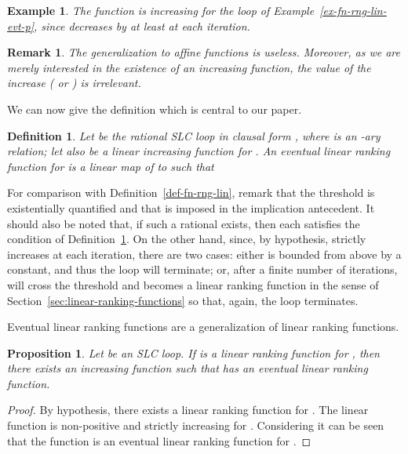 \documentclass{acm_proc_article-sp}
\newtheorem{proposition}[theorem]{Proposition}
\newtheorem{definition}[theorem]{Definition}
\newtheorem{example}[theorem]{Example}
\newtheorem{remark}[theorem]{Remark}
\begin{document}
\begin{example}
\label{ex-fn-rng-lin-evt-f}
The function  is increasing for the loop of
\textup{Example~\ref{ex-fn-rng-lin-evt-p}}, since  decreases by at
least  at each iteration.
\end{example}

\begin{remark}
The generalization to affine functions  is useless.
Moreover, as we are merely interested in the existence of an
increasing function, the value of the increase ( or )
is irrelevant.
\end{remark}

We can now give the definition which is central to our paper.

\begin{definition}
\label{def-fn-rng-lin-evt}
Let  be the rational SLC loop in clausal form
,
where  is an -ary relation;
let also  be a linear increasing function for .
An \emph{eventual linear ranking function}  for 
is a linear map of  to  such that

\end{definition}
For comparison with Definition~\ref{def-fn-rng-lin},
remark that the threshold  is existentially quantified
and that  is imposed in the implication antecedent.
It should also be noted that, if such a rational  exists,
then each  satisfies the condition
of Definition~\ref{def-fn-rng-lin-evt}.
On the other hand, since, by hypothesis,  strictly increases
at each iteration, there are two cases:
either  is bounded from above by a constant, and thus the loop will
terminate;
or, after a finite number of iterations,  will cross the threshold 
and  becomes a linear ranking function in the sense of
Section~\ref{sec:linear-ranking-functions} so that, again, the loop terminates.

Eventual linear ranking functions are a generalization
of linear ranking functions.

\begin{proposition}
\label{lrf-implies-elrf}
Let  be an SLC loop. If  is  a linear ranking function for ,
then there exists an increasing function  such that 
has an eventual linear ranking function.
\end{proposition}
\begin{proof}
By hypothesis, there exists a linear ranking function
 for .
The linear function 
is non-positive and strictly increasing for .
Considering  it can be seen that the function
 is an eventual linear
ranking function for .
\end{proof}
\end{document}
